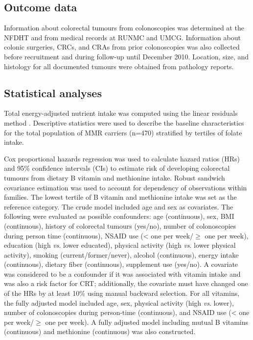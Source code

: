 \subsection{Outcome data} %
\noindent Information about colorectal tumours from colonoscopies was determined at the NFDHT \cite{c632} and from medical records at RUNMC and UMCG. Information about colonic surgeries, CRCs, and CRAs from prior colonoscopies was also collected before recruitment and during follow-up until December 2010. Location, size, and histology for all documented tumours were obtained from pathology reports.

\subsection{Statistical analyses} %
\noindent Total energy-adjusted nutrient intake was computed using the linear residuals method \cite{c633}. Descriptive statistics were used to describe the baseline characteristics for the total population of MMR carriers (n=470) stratified by tertiles of folate intake.

\noindent Cox proportional hazards regression was used to calculate hazard ratios (HRs) and 95\% confidence intervals (CIs) to estimate risk of developing colorectal tumours from dietary B vitamin and methionine intake. Robust sandwich covariance estimation was used to account for dependency of observations within families. The lowest tertile of B vitamin and methionine intake was set as the reference category. The crude model included age and sex as covariates. The following were evaluated as possible confounders: age (continuous), sex, BMI (continuous), history of colorectal tumours (yes/no), number of colonoscopies during person time (continuous), NSAID use (< one per week/$\geq$ one per week), education (high \emph{vs}. lower educated), physical activity (high \emph{vs}. lower physical activity), smoking (current/former/never), alcohol (continuous), energy intake (continuous), dietary fiber (continuous), supplement use (yes/no). A covariate was considered to be a confounder if it was associated with 
vitamin intake and was also a risk factor for CRT; additionally, the covariate must have changed one of the HRs by at least 10\% using manual backward selection. For all vitamins, the fully adjusted model included age, sex, physical activity (high \emph{vs}. lower), number of colonoscopies during person-time (continuous), and NSAID use (< one per week/$\geq$ one per week). A fully adjusted model including mutual B vitamins (continuous) and methionine (continuous) was also constructed.

